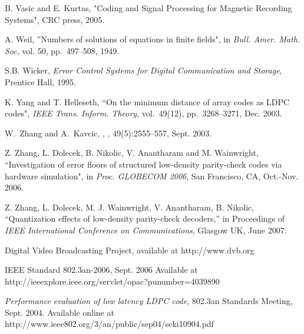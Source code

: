 \begin{thebibliography}{10}
B. Vasic and E. Kurtas, "Coding and Signal Processing for Magnetic
Recording Systems", CRC press, 2005.

A. Weil, ''Numbers of solutions of equations in finite fields", in
\emph{Bull. Amer. Math. Soc}, vol. 50, pp.~497--508, 1949.

S.B. Wicker, \emph{Error Control Systems for Digital Communication
and Storage}, Prentice Hall, 1995.

K. Yang and T. Helleseth, ``On the minimum distance of array codes
as LDPC codes", \emph{IEEE Trans. Inform. Theory}, vol.\ 49(12),
pp.~3268--3271, Dec. 2003.

W.~Zhang and A.~Kavcic,
,
, 49(5):2555--557, Sept. 2003.


Z. Zhang, L. Dolecek, B. Nikolic, V. Anantharam and M. Wainwright,
``Investigation of error floors of structured low-density
parity-check codes via hardware simulation", in \emph{Proc.
GLOBECOM 2006}, San Francisco, CA, Oct.-Nov. 2006.


Z. Zhang, L. Dolecek, M. J. Wainwright, V. Anantharam, B. Nikolic,
``Quantization effects of low-density parity-check decoders,'' in
Proceedings of \emph{IEEE International Conference on
Communications}, Glasgow UK, June 2007.

Digital Video Broadcasting Project, available at http://www.dvb.org

IEEE Standard 802.3an-2006, Sept. 2006 Available at
http://ieeexplore.ieee.org/servlet/opac?punumber=4039890

 \emph{Performance evaluation of low latency LDPC code}, 802.3an Standards
Meeting, Sept. 2004. Available online at
http://www.ieee802.org/3/an/public/sep04/seki10904.pdf


\end{thebibliography}
